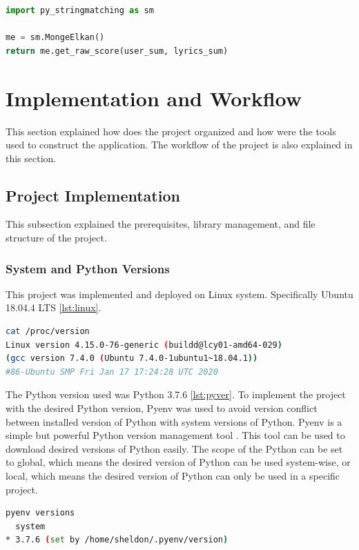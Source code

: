 \begin{lstlisting}[language=Python, label={lst:monge}, caption=Monge-Elkan Similarity]
import py_stringmatching as sm

me = sm.MongeElkan()
return me.get_raw_score(user_sum, lyrics_sum)
\end{lstlisting}

\section{Implementation and Workflow}

This section explained how does the project organized and how were the tools used
to construct the application. The workflow of the project is also explained in
this section.

\subsection{Project Implementation}

This subsection explained the prerequisites, library management, and file structure
of the project.

\subsubsection{System and Python Versions}

This project was implemented and deployed on Linux system. Specifically Ubuntu
18.04.4 LTS \ref{lst:linux}.

\begin{lstlisting}[language=bash, label={lst:linux}, caption=System Version]
cat /proc/version
Linux version 4.15.0-76-generic (buildd@lcy01-amd64-029)
(gcc version 7.4.0 (Ubuntu 7.4.0-1ubuntu1~18.04.1))
#86-Ubuntu SMP Fri Jan 17 17:24:28 UTC 2020
\end{lstlisting}

The Python version used was Python 3.7.6 \ref{lst:pyver}. To implement the project
with the desired Python version, Pyenv was used to avoid version conflict between
installed version of Python with system versions of Python. Pyenv is a simple but
powerful Python version management tool \cite{pyenv}. This tool can be used to
download desired versions of Python easily. The scope of the Python can be set to
global, which means the desired version of Python can be used system-wise, or local,
which means the desired version of Python can only be used in a specific project.

\begin{lstlisting}[language=bash, label={lst:pyver}, caption=Python Version]
pyenv versions
  system
* 3.7.6 (set by /home/sheldon/.pyenv/version)
\end{lstlisting}


